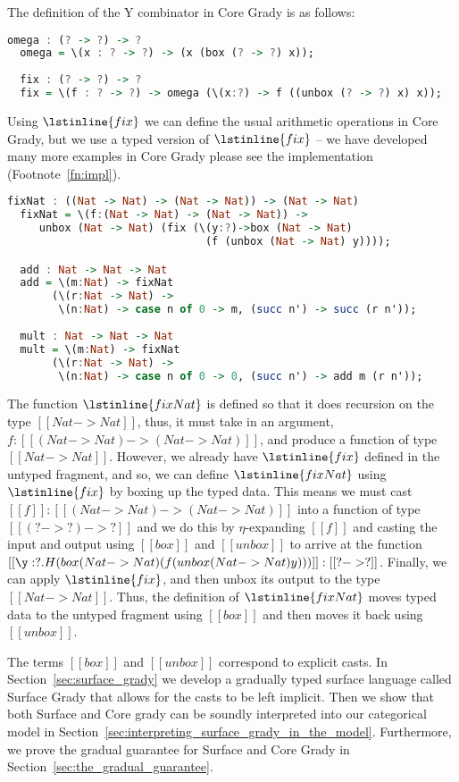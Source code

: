 The definition of the Y combinator in Core Grady is as follows:
\begin{lstlisting}[language=Haskell]
  omega : (? -> ?) -> ?
  omega = \(x : ? -> ?) -> (x (box (? -> ?) x));
  
  fix : (? -> ?) -> ?
  fix = \(f : ? -> ?) -> omega (\(x:?) -> f ((unbox (? -> ?) x) x));
\end{lstlisting}
Using $\lstinline{fix}$ we can define the usual arithmetic operations
in Core Grady, but we use a typed version of $\lstinline{fix}$ -- we
have developed many more examples in Core Grady please see the
implementation (Footnote~\ref{fn:impl}).
\begin{lstlisting}[language=Haskell]
  fixNat : ((Nat -> Nat) -> (Nat -> Nat)) -> (Nat -> Nat)
  fixNat = \(f:(Nat -> Nat) -> (Nat -> Nat)) ->
     unbox (Nat -> Nat) (fix (\(y:?)->box (Nat -> Nat) 
                               (f (unbox (Nat -> Nat) y))));

  add : Nat -> Nat -> Nat
  add = \(m:Nat) -> fixNat
       (\(r:Nat -> Nat) ->
        \(n:Nat) -> case n of 0 -> m, (succ n') -> succ (r n'));
        
  mult : Nat -> Nat -> Nat
  mult = \(m:Nat) -> fixNat
       (\(r:Nat -> Nat) ->
        \(n:Nat) -> case n of 0 -> 0, (succ n') -> add m (r n'));
\end{lstlisting}
The function $\lstinline{fixNat}$ is defined so that it does recursion
on the type $[[Nat -> Nat]]$, thus, it must take in an argument,
$f : [[(Nat -> Nat) -> (Nat -> Nat)]]$, and
produce a function of type $[[Nat -> Nat]]$.  However, we
already have $\lstinline{fix}$ defined in the untyped fragment, and
so, we can define $\lstinline{fixNat}$ using $\lstinline{fix}$ by
boxing up the typed data.  This means we must cast $[[f]] : [[(Nat -> Nat) -> (Nat -> Nat)]]$ into a function of type
$[[(? -> ?) -> ?]]$ and we do this by $\eta$-expanding
$[[f]]$ and casting the input and output using $[[box]]$ and
$[[unbox]]$ to arrive at the function
$[[\y:?.H(box (Nat -> Nat) (f (unbox (Nat -> Nat) y)))]] : [[? -> ?]]$.  Finally, we can apply $\lstinline{fix}$, and then unbox its output to the type $[[Nat -> Nat]]$.
Thus, the definition of $\lstinline{fixNat}$ moves typed data to the
untyped fragment using $[[box]]$ and then moves it back using
$[[unbox]]$.

The terms $[[box]]$ and $[[unbox]]$ correspond to explicit casts.  In
Section~\ref{sec:surface_grady} we develop a gradually typed surface
language called Surface Grady that allows for the casts to be left
implicit.  Then we show that both Surface and Core grady can be
soundly interpreted into our categorical model in
Section~\ref{sec:interpreting_surface_grady_in_the_model}.
Furthermore, we prove the gradual guarantee for Surface and Core Grady
in Section~\ref{sec:the_gradual_guarantee}.

